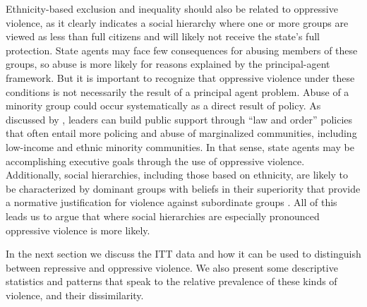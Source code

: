 \documentclass[11pt]{article}
\begin{document}
Ethnicity-based exclusion and inequality should also be related to oppressive violence, as it clearly indicates a social hierarchy where one or more groups are viewed as less than full citizens and will likely not receive the state's full protection. State agents may face few consequences for abusing members of these groups, so abuse is more likely for reasons explained by the principal-agent framework. But it is important to recognize that oppressive violence under these conditions is not necessarily the result of a principal agent problem. Abuse of a minority group could occur systematically as a direct result of policy. As discussed by \citet{Rejali2007}, leaders can build public support through ``law and order'' policies that often entail more policing and abuse of marginalized  communities, including low-income and ethnic minority communities. In that sense, state agents may be accomplishing executive goals through the use of oppressive violence. Additionally, social hierarchies, including those based on ethnicity, are likely to be characterized by dominant groups with beliefs in their superiority that provide a normative justification for violence against subordinate groups \citep{sidanius2001social}. All of this leads us to argue that where social hierarchies are especially pronounced oppressive violence is more likely. 

In the next section we discuss the ITT data and how it can be used to distinguish between repressive and oppressive violence. We also present some descriptive statistics and patterns that speak to the relative prevalence of these kinds of violence, and their dissimilarity. 

\end{document}
